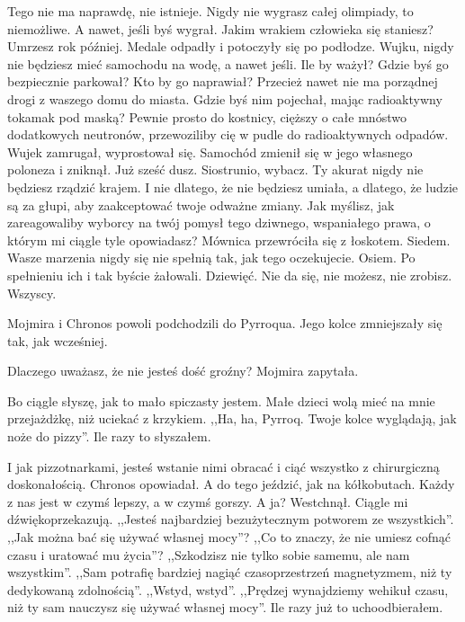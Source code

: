 \ds{}
Tego nie ma naprawdę, nie istnieje.
Nigdy nie wygrasz całej olimpiady, to niemożliwe.
A nawet, jeśli byś wygrał. Jakim wrakiem człowieka się staniesz?
Umrzesz rok później.
\dm{} Medale odpadły i potoczyły się po podłodze. \dm{}
Wujku, nigdy nie będziesz mieć samochodu na wodę, a nawet jeśli.
Ile by ważył? Gdzie byś go bezpiecznie parkował? Kto by go naprawiał?
Przecież nawet nie ma porządnej drogi z waszego domu do miasta.
Gdzie byś nim pojechał, mając radioaktywny tokamak pod maską?
Pewnie prosto do kostnicy, cięższy o całe mnóstwo dodatkowych neutronów, przewoziliby cię w pudle do radioaktywnych odpadów.
\dm{} Wujek zamrugał, wyprostował się. Samochód zmienił się w jego własnego poloneza i zniknął. Już sześć dusz. \dm{}
Siostrunio, wybacz. Ty akurat nigdy nie będziesz rządzić krajem. I nie dlatego, że nie będziesz umiała, a dlatego, że ludzie są za głupi, aby zaakceptować 
twoje odważne zmiany. Jak myślisz, jak zareagowaliby wyborcy na twój pomysł tego dziwnego, wspaniałego prawa, o którym mi ciągle tyle opowiadasz?
\dm{} Mównica przewróciła się z łoskotem. Siedem. \dm{}
Wasze marzenia nigdy się nie spełnią tak, jak tego oczekujecie. \dm{} Osiem. \dm{}
Po spełnieniu ich i tak byście żałowali. \dm{} Dziewięć. \dm{}
Nie da się, nie możesz, nie zrobisz. \dm{} Wszyscy. \dm{}

Mojmira i Chronos powoli podchodzili do Pyrroqua. Jego kolce zmniejszały się tak, jak wcześniej.

\ds{} Dlaczego uważasz, że nie jesteś dość groźny? \dm{} Mojmira zapytała. \de{}

\ds{} Bo ciągle słyszę, jak to mało spiczasty jestem. Małe dzieci wolą mieć na mnie przejażdżkę, niż uciekać z krzykiem.
,,Ha, ha, Pyrroq. Twoje kolce wyglądają, jak noże do pizzy''. Ile razy to słyszałem. \de{}

\ds{} I jak pizzotnarkami, jesteś wstanie nimi obracać i ciąć wszystko z chirurgiczną doskonałością. \dm{} Chronos opowiadał. \dm{} A do tego jeździć, jak na kółkobutach.
Każdy z nas jest w czymś lepszy, a w czymś gorszy. A ja? \dm{} Westchnął. \dm{} Ciągle mi dźwiękoprzekazują. ,,Jesteś najbardziej bezużytecznym potworem ze wszystkich''. 
,,Jak można bać się używać własnej mocy''? ,,Co to znaczy, że nie umiesz cofnąć czasu i uratować mu życia''?
,,Szkodzisz nie tylko sobie samemu, ale nam wszystkim''.
,,Sam potrafię bardziej nagiąć czasoprzestrzeń magnetyzmem, niż ty dedykowaną zdolnością''.
,,Wstyd, wstyd''. ,,Prędzej wynajdziemy wehikuł czasu, niż ty sam nauczysz się używać własnej mocy''. Ile razy już to uchoodbierałem. \de{}

